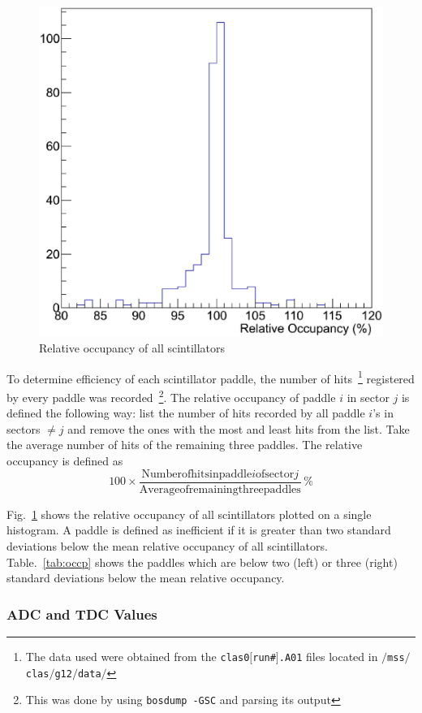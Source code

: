 
\begin{figure}\begin{center}
    \includegraphics[trim=0 40 10 40,clip,width=.40\linewidth]{figures/calib/tof/tofko/occp.eps}
    \caption{Relative occupancy of all scintillators}
    \label{plt:occp}
\end{center}\end{figure}

To determine efficiency of each scintillator paddle, the number of hits~\footnote{The data used were obtained from the \texttt{clas\underline{\hspace{5pt}}0$[$run\#$]$.A01} files located in \texttt{$/$mss$/$clas$/$g12$/$data$/$}} registered by every paddle was recorded~\footnote{This was done by using \texttt{bosdump -GSC} and parsing its output}. The relative occupancy of paddle $i$ in sector $j$ is defined the following way: list the number of hits recorded by all paddle $i$'s in sectors $\neq j$ and remove the ones with the most and least hits from the list. Take the average number of hits of the remaining three paddles. The relative occupancy is defined as
\[
100 \times \frac{ \mathrm{Number of hits in paddle } i \mathrm{ of sector } j}{\mathrm{Average of remaining three paddles}} \hspace{2pt}\%
\]

Fig.~\ref{plt:occp} shows the relative occupancy of all scintillators plotted on a single histogram. A paddle is defined as inefficient if it is greater than two standard deviations below the mean relative occupancy of all scintillators. Table.~\ref{tab:occp} shows the paddles which are below two (left) or three (right) standard deviations below the mean relative occupancy.


\subsubsection{ADC and TDC Values}

